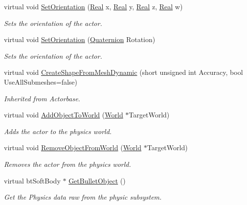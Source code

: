 \begin{DoxyCompactItemize}
virtual void \hyperlink{classphys_1_1ActorSoft_a84541e8ebf7b54c91d2353d5f84381bb}{SetOrientation} (\hyperlink{namespacephys_af7eb897198d265b8e868f45240230d5f}{Real} x, \hyperlink{namespacephys_af7eb897198d265b8e868f45240230d5f}{Real} y, \hyperlink{namespacephys_af7eb897198d265b8e868f45240230d5f}{Real} z, \hyperlink{namespacephys_af7eb897198d265b8e868f45240230d5f}{Real} w)
\begin{DoxyCompactList}\small\item\em Sets the orientation of the actor. \item\end{DoxyCompactList}\item 
virtual void \hyperlink{classphys_1_1ActorSoft_ad57b502da0658de31a4b3a9bb9be7900}{SetOrientation} (\hyperlink{classphys_1_1Quaternion}{Quaternion} Rotation)
\begin{DoxyCompactList}\small\item\em Sets the orientation of the actor. \item\end{DoxyCompactList}\item 
\hypertarget{classphys_1_1ActorSoft_a65e5590d1fe4c11e2214d5e6a3d1fc96}{
virtual void \hyperlink{classphys_1_1ActorSoft_a65e5590d1fe4c11e2214d5e6a3d1fc96}{CreateShapeFromMeshDynamic} (short unsigned int Accuracy, bool UseAllSubmeshes=false)}
\label{d4/d23/classphys_1_1ActorSoft_a65e5590d1fe4c11e2214d5e6a3d1fc96}

\begin{DoxyCompactList}\small\item\em Inherited from Actorbase. \item\end{DoxyCompactList}\item 
virtual void \hyperlink{classphys_1_1ActorSoft_a5f97915d1cda0d048853718714a26d93}{AddObjectToWorld} (\hyperlink{classphys_1_1World}{World} $\ast$TargetWorld)
\begin{DoxyCompactList}\small\item\em Adds the actor to the physics world. \item\end{DoxyCompactList}\item 
virtual void \hyperlink{classphys_1_1ActorSoft_ab65d106fcc1ee5243a990e7b42326bf0}{RemoveObjectFromWorld} (\hyperlink{classphys_1_1World}{World} $\ast$TargetWorld)
\begin{DoxyCompactList}\small\item\em Removes the actor from the physics world. \item\end{DoxyCompactList}\item 
virtual btSoftBody $\ast$ \hyperlink{classphys_1_1ActorSoft_a33b3fa2d6fcbb4e742e53fbde22f21a9}{GetBulletObject} ()
\begin{DoxyCompactList}\small\item\em Get the Physics data raw from the physic subsystem. \item\end{DoxyCompactList}\end{DoxyCompactItemize}
